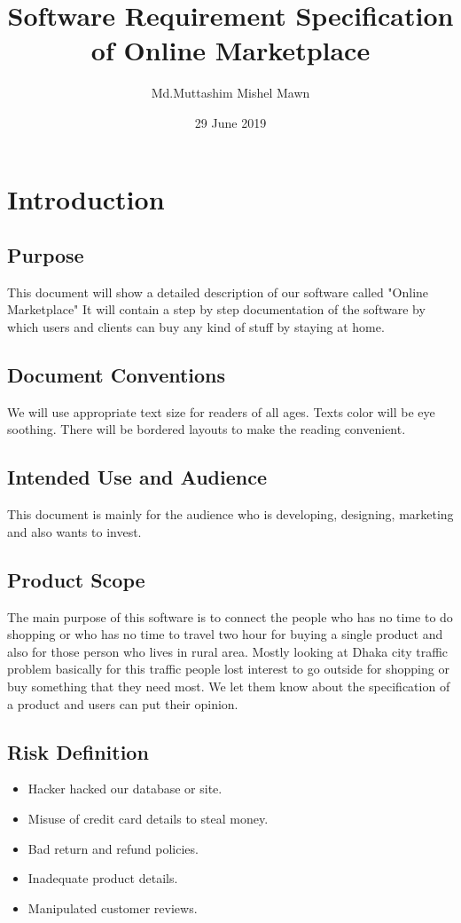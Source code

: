 \documentclass{article}
\title{Software Requirement Specification of Online Marketplace}
\author{Md.Muttashim Mishel Mawn}
\date{29 June 2019}
\begin{document}
\tableofcontents
\clearpage
\maketitle

\section{Introduction}
\subsection{Purpose}
This document will show a detailed description of our software called "Online Marketplace" It will contain a step by step documentation of the software by which users and clients can buy any kind of stuff by staying at home.
\subsection{Document Conventions}
We will use appropriate text size for readers of all ages. Texts color will be eye soothing. There will be bordered layouts to make the reading convenient.
\subsection{Intended Use and Audience}
This document is mainly for the audience who is developing, designing, marketing and also wants to invest.
\subsection{Product Scope}
The main purpose of this software is to connect the people who has no time to do shopping or who has no time to travel two hour for buying a single product and also for those person who lives in rural area. Mostly looking at Dhaka city traffic problem basically for this traffic people lost interest to go outside for shopping or buy something that they need most. We let them know about the specification of a product and users can put their opinion.
\subsection{Risk Definition}
\begin{itemize}
\item Hacker hacked our database or site.
\item Misuse of credit card details to steal money.
\item Bad return and refund policies. 
\item Inadequate product details.
\item Manipulated customer reviews.
\end{itemize}
\end{document}
